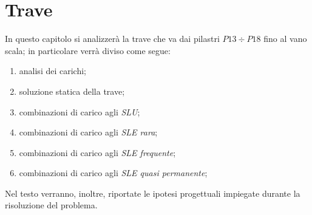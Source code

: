 \cleardoublepage
\chapter{Trave}\label{chap:beam}
In questo capitolo si analizzerà la trave che va dai pilastri $P13 \div P18$ fino al vano scala; in particolare verrà diviso come segue:
\begin{enumerate}
 \item analisi dei carichi;
 \item soluzione statica della trave;
 \item combinazioni di carico agli \emph{SLU};
 \item combinazioni di carico agli \emph{SLE rara};
 \item combinazioni di carico agli \emph{SLE frequente};
 \item combinazioni di carico agli \emph{SLE quasi permanente};
\end{enumerate}



Nel testo verranno, inoltre, riportate le ipotesi progettuali impiegate durante la risoluzione del problema.

